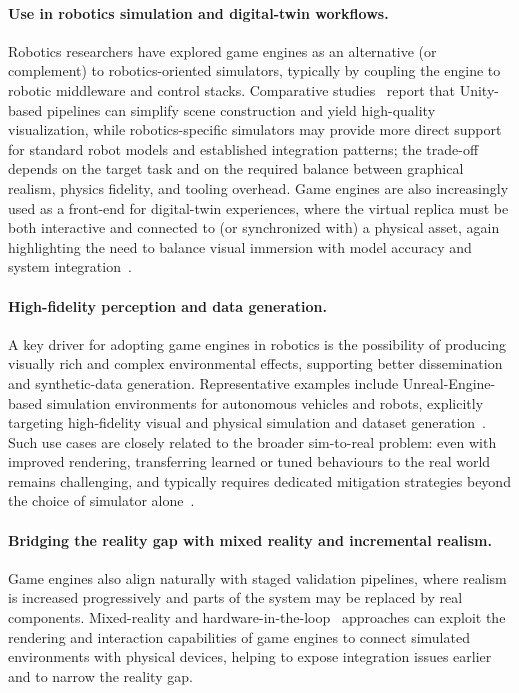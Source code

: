 \paragraph{Use in robotics simulation and digital-twin workflows.}
Robotics researchers have explored game engines as an alternative (or complement) to
robotics-oriented simulators, typically by coupling the engine to robotic middleware and
control stacks.
%
Comparative studies~\cite{DBLP:journals/jirs/PlattR22,DBLP:journals/simpra/WijayaCPKG24,DBLP:journals/simpra/FarleyWM22}
report that Unity-based pipelines can simplify scene construction and yield
high-quality visualization, while robotics-specific simulators may provide more direct support
for standard robot models and established integration patterns; the trade-off depends on the
target task and on the required balance between graphical realism, physics fidelity, and tooling
overhead.
%
Game engines are also increasingly used as a front-end for digital-twin experiences, where the
virtual replica must be both interactive and connected to (or synchronized with) a physical asset,
again highlighting the need to balance visual immersion with model accuracy and system
integration~\cite{Singh2025UnityGazeboDT}.
%

\paragraph{High-fidelity perception and data generation.}
A key driver for adopting game engines in robotics is the possibility of producing
visually rich and complex environmental effects,
supporting better dissemination and synthetic-data generation.
%
Representative examples include Unreal-Engine-based simulation environments for autonomous
vehicles and robots, explicitly targeting high-fidelity visual and physical simulation and
dataset generation~\cite{DBLP:conf/fsr/ShahDLK17,Wolf2020}.
%
Such use cases are closely related to the broader sim-to-real problem:
even with improved
rendering, transferring learned or tuned behaviours to the real world remains challenging,
and typically requires dedicated mitigation strategies
beyond the choice of simulator alone~\cite{DBLP:journals/natmi/JuJGNL22}.

\paragraph{Bridging the reality gap with mixed reality and incremental realism.}

Game engines also align naturally with staged validation pipelines, where realism is increased
progressively and parts of the system may be replaced by real components.
%
Mixed-reality and hardware-in-the-loop~\cite{Sende2024} approaches can exploit the rendering and interaction
capabilities of game engines to connect simulated environments with physical devices, helping
to expose integration issues earlier and to narrow the reality gap.

